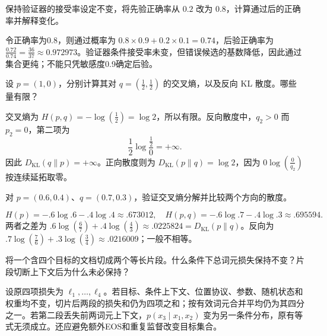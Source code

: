 
\begin{exercises}
\begin{exercise} 保持验证器的接受率设定不变，将先验正确率从 $0.2$ 改为 $0.8$，计算通过后的正确率并解释变化。

\begin{solution}
令正确率为0.8，则通过概率为 $0.8\times0.9+0.2\times0.1=0.74$，后验正确率为 $\frac{0.72}{0.74}=\frac{36}{37}\approx0.972973$。验证器条件接受率未变，但错误候选的基数降低，因此通过集合更纯；不能只凭敏感度0.9确定后验。
\end{solution}
\end{exercise}

\begin{exercise} 设 $p=(1,0)$，分别计算其对 $q=(\frac{1}{2},\frac{1}{2})$ 的交叉熵，以及反向 KL 散度。哪些量有限？

\begin{solution}
交叉熵为 $H(p,q)=-\log(\frac{1}{2})=\log 2$，所以有限。反向散度中，$q_2>0$ 而 $p_2=0$，第二项为
\[
\frac12\log\frac{\frac{1}{2}}{0}=+\infty.
\]
因此 $D_{\mathrm{KL}}(q\|p)=+\infty$。正向散度则为 $D_{\mathrm{KL}}(p\|q)=\log 2$，因为 $0\log(\frac{0}{q_2})$ 按连续延拓取零。
\end{solution}
\end{exercise}

\begin{exercise} 对 $p=(0.6,0.4)$、$q=(0.7,0.3)$，验证交叉熵分解并比较两个方向的散度。

\begin{solution}
\[
H(p)=-.6\log.6-.4\log.4\approx.673012,
\quad H(p,q)=-.6\log.7-.4\log.3\approx.695594.
\]
两者之差为 $.6\log(\frac{6}{7})+.4\log(\frac{4}{3})\approx.0225824=D_{\mathrm{KL}}(p\|q)$。反向为 $.7\log(\frac{7}{6})+.3\log(\frac{3}{4})\approx.0216009$；一般不相等。
\end{solution}
\end{exercise}

\begin{exercise} 将一个含四个目标的文档切成两个等长片段。什么条件下总词元损失保持不变？片段切断上下文后为什么未必保持？

\begin{solution}
设原四项损失为 $\ell_1,\ldots,\ell_4$。若目标、条件上下文、位置协议、参数、随机状态和权重均不变，切片后两段的损失和仍为四项之和；按有效词元合并平均仍为其四分之一。若第二段丢失前两词元上下文，$p(x_3\mid x_1,x_2)$ 变为另一条件分布，原有等式无须成立。还应避免额外EOS和重复监督改变目标集合。
\end{solution}
\end{exercise}


\end{exercises}
